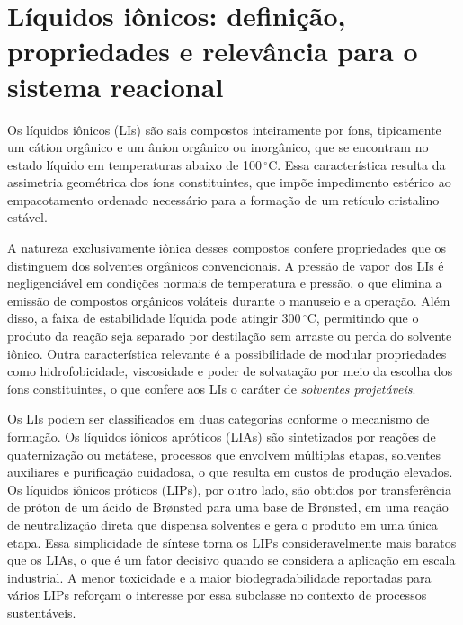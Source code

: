 \section{Líquidos iônicos: definição, propriedades e relevância
         para o sistema reacional}

Os líquidos iônicos (LIs) são sais compostos inteiramente por íons, tipicamente um cátion orgânico e um ânion orgânico ou inorgânico, que se encontram no estado líquido em temperaturas abaixo de 100\,$^{\circ}$C\cite{trindade2019}. Essa característica resulta da assimetria geométrica dos íons constituintes, que impõe impedimento estérico ao empacotamento ordenado necessário para a formação de um retículo cristalino estável\cite{alvarez2010}.

A natureza exclusivamente iônica desses compostos confere propriedades que os distinguem dos solventes orgânicos convencionais. A pressão de vapor dos LIs é negligenciável em condições normais de temperatura e pressão, o que elimina a emissão de compostos orgânicos voláteis durante o manuseio e a operação\cite{alvarez2010}. Além disso, a faixa de estabilidade líquida pode atingir 300\,$^{\circ}$C, permitindo que o produto da reação seja separado por destilação sem arraste ou perda do solvente iônico\cite{alvarez2010}. Outra característica relevante é a possibilidade de modular propriedades como hidrofobicidade, viscosidade e poder de solvatação por meio da escolha dos íons constituintes, o que confere aos LIs o caráter de \textit{solventes projetáveis}\cite{trindade2019,alvarez2010}.

Os LIs podem ser classificados em duas categorias conforme o mecanismo de formação. Os líquidos iônicos apróticos (LIAs) são sintetizados por reações de quaternização ou metátese, processos que envolvem múltiplas etapas, solventes auxiliares e purificação cuidadosa, o que resulta em custos de produção elevados\cite{troter2016,muhammad2015}. Os líquidos iônicos próticos (LIPs), por outro lado, são obtidos por transferência de próton de um ácido de Brønsted para uma base de Brønsted, em uma reação de neutralização direta que dispensa solventes e gera o produto em uma única etapa\cite{alvarez2010,trindade2019}. Essa simplicidade de síntese torna os LIPs consideravelmente mais baratos que os LIAs, o que é um fator decisivo quando se considera a aplicação em escala industrial. A menor toxicidade e a maior biodegradabilidade reportadas para vários LIPs reforçam o interesse por essa subclasse no contexto de processos sustentáveis\cite{trindade2019}.


